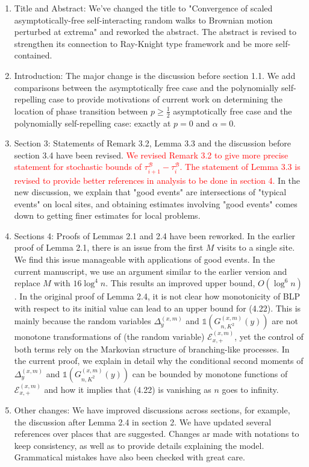 \documentclass[11pt,a4paper]{article}
\numberwithin{equation}{section}
\def\TBF#1{\textcolor{red}{#1}} %
\begin{document}
	\begin{enumerate}
		\item Title and Abstract: We've changed the title to "Convergence of scaled asymptotically-free
		self-interacting random walks to Brownian motion
		perturbed at extrema" and reworked the abstract. The abstract is revised to strengthen its connection to Ray-Knight type framework and be more self-contained.
		
		\item Introduction: The major change is the discussion before section 1.1. We add comparisons between the asymptotically free case and the polynomially self-repelling case to provide motivations of current work on determining the location of phase transition between $p\geq \frac{1}{2}$ asymptotically free case and the polynomially self-repelling case: exactly at $p = 0$ and $\alpha = 0$.
		
		\item Section 3:  Statements of Remark 3.2, Lemma 3.3 and the discussion before section 3.4 have been revised. \TBF{We revised Remark 3.2 to give more precise statement for stochastic bounds of $\tau_{i+1}^{\mathcal{B}}-\tau_{i}^{\mathcal{B}}$. The statement of Lemma 3.3 is revised to provide better references in analysis to be done in section 4.}
		In the new discussion, we explain that "good events" are intersections of "typical events" on local sites, and obtaining estimates involving "good events" comes down to getting finer estimates for local problems.
		
		
		
		\item Sections 4: Proofs of Lemmas 2.1 and 2.4 have been reworked. In the earlier proof of Lemma 2.1, there is an issue from the first $M$ visits to a single site. We find this issue manageable with applications of good events. In the current manuscript, we use an argument similar to the earlier version and replace $M$ with $16\log^4 n$. This results an improved upper bound, $O(\log^6 n)$. In the original proof of Lemma 2.4, it is not clear how monotonicity of BLP with respect to its initial value can lead to an upper bound for (4.22). This is mainly because the random variables $\Delta_{y}^{(x,m)}$ and $\mathbb{1}\left(G^{(x,m)}_{n,K^2}(y) \right)$ are not monotone transformations of (the random variable) $\mathcal{E}^{(x,m)}_{x,+}$, yet the control of both terms rely on the Markovian structure of branching-like processes. In the current proof, we explain in detail why the conditional second moments of $\Delta_{y}^{(x,m)}$ and $\mathbb{1}\left(G^{(x,m)}_{n,K^2}(y) \right)$ can be bounded by monotone functions of $\mathcal{E}^{(x,m)}_{x,+}$ and how it implies that (4.22) is vanishing as $n$ goes to infinity.  
		
		\item Other changes: We have improved discussions across sections, for example, the discussion after Lemma 2.4 in section 2. We have updated several references over places that are suggested. Changes ar made with notations to keep consistency, as well as to provide details explaining the model. Grammatical mistakes have also been checked with great care.  
		
	\end{enumerate}
	
\end{document}
